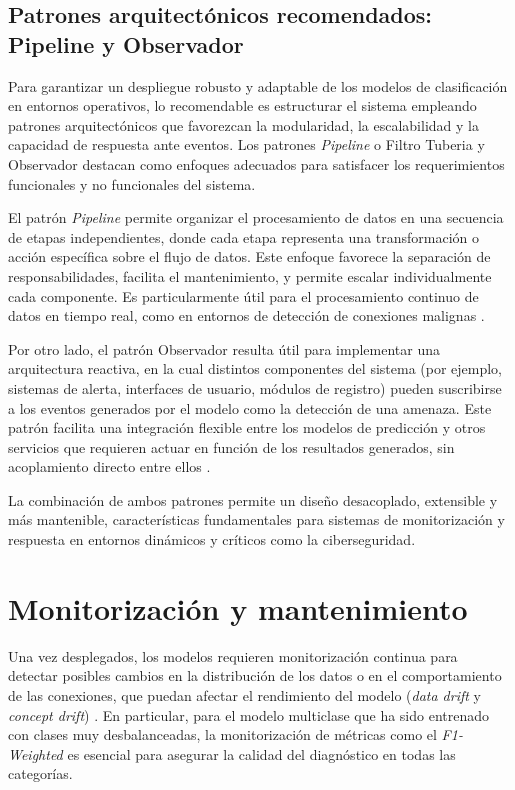 \subsection{Patrones arquitectónicos recomendados: Pipeline y Observador}

Para garantizar un despliegue robusto y adaptable de los modelos de clasificación en entornos operativos, lo recomendable es estructurar el sistema empleando patrones arquitectónicos que favorezcan la modularidad, la escalabilidad y la capacidad de respuesta ante eventos. Los patrones \textit{Pipeline} o Filtro Tuberia y Observador destacan como enfoques adecuados para satisfacer los requerimientos funcionales y no funcionales del sistema.

El patrón \textit{Pipeline} permite organizar el procesamiento de datos en una secuencia de etapas independientes, donde cada etapa representa una transformación o acción específica sobre el flujo de datos. Este enfoque favorece la separación de responsabilidades, facilita el mantenimiento, y permite escalar individualmente cada componente. Es particularmente útil para el procesamiento continuo de datos en tiempo real, como en entornos de detección de conexiones malignas \cite{neptune_ml_pipeline}.

Por otro lado, el patrón Observador resulta útil para implementar una arquitectura reactiva, en la cual distintos componentes del sistema (por ejemplo, sistemas de alerta, interfaces de usuario, módulos de registro) pueden suscribirse a los eventos generados por el modelo como la detección de una amenaza. Este patrón facilita una integración flexible entre los modelos de predicción y otros servicios que requieren actuar en función de los resultados generados, sin acoplamiento directo entre ellos \cite{gof_observer_pattern}.

La combinación de ambos patrones permite un diseño desacoplado, extensible y más mantenible, características fundamentales para sistemas de monitorización y respuesta en entornos dinámicos y críticos como la ciberseguridad.


\section{Monitorización y mantenimiento}
Una vez desplegados, los modelos requieren monitorización continua para detectar posibles cambios en la distribución de los datos o en el comportamiento de las conexiones, que puedan afectar el rendimiento del modelo (\textit{data drift} y \textit{concept drift}) \cite{gama2014survey}. En particular, para el modelo multiclase que ha sido entrenado con clases muy desbalanceadas, la monitorización de métricas como el \textit{F1-Weighted} es esencial para asegurar la calidad del diagnóstico en todas las categorías.

